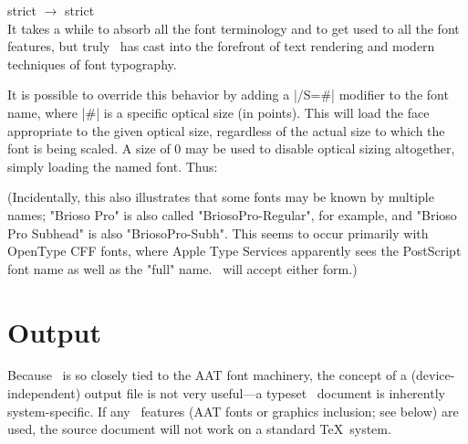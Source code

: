 \def\test#1#2{%
#2 $\to$ {\addfontfeature{#1} #2}\\}
\test{Ligatures=Historic}{strict}

It takes a while to absorb all the font terminology and to get
used to all the font features, but truly \XeTeX\ has cast
\tex into the forefront of text rendering and modern
techniques of font typography. 


It is possible to override this behavior by adding a |/S=#| modifier to the font name, where |#| is a specific optical size (in points). This will load the face appropriate to the given optical size, regardless of the actual size to which the font is being scaled. A size of 0 may be used to disable optical sizing altogether, simply loading the named font. Thus:

\begin{comment}
\begin{quote}
\begin{tabular}{ll}
\em Name and size requested&\em Font used\cr
\showfont{"Brioso Pro/S=7" at 9pt}{BriosoPro-Capt}
\showfont{"Brioso Pro/S=10" at 9pt}{BriosoPro-Regular}
\showfont{"Brioso Pro/S=18" at 9pt}{BriosoPro-Subh}
\showfont{"Brioso Pro/S=36" at 9pt}{BriosoPro-Disp}
\showfont{"Brioso Pro Subhead" at 9pt}{BriosoPro-Capt}
\showfont{"Brioso Pro Subhead/S=0" at 9pt}{BriosoPro-Subh}
\end{tabular}
\end{quote}
\end{comment}


(Incidentally, this also illustrates that some fonts may be known by multiple names; "Brioso Pro" is also called "BriosoPro-Regular", for example, and "Brioso Pro Subhead" is also "BriosoPro-Subh". This seems to occur primarily with OpenType CFF fonts, where Apple Type Services apparently sees the PostScript font name as well as the "full" name. \XeTeX\ will accept either form.)

\section{Output}

Because \XeTeX\ is so closely tied to the AAT font machinery, the concept of a  (device-independent) output file is not very useful—a typeset \XeTeX\ document is inherently system-specific. If any \XeTeX\ features (AAT fonts or graphics inclusion; see below) are used, the source document will not work on a standard \TeX\ system.

